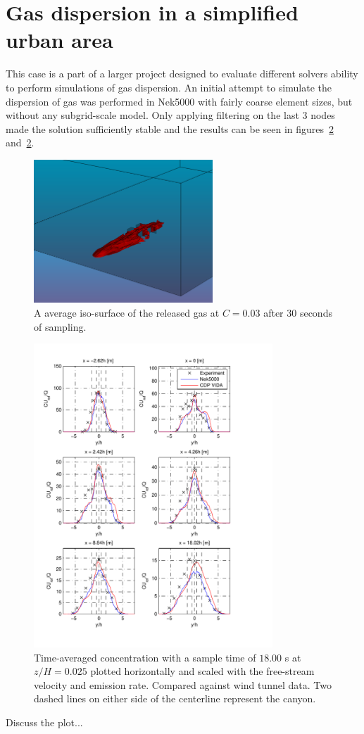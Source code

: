 \section{Gas dispersion in a simplified urban area} 
This case is a part of a larger project designed to evaluate different solvers 
ability to perform simulations of gas dispersion. An initial attempt to simulate the 
dispersion of gas was performed in Nek5000 with fairly coarse element sizes, but without
any subgrid-scale model. Only applying filtering on the last 3 nodes made the solution 
sufficiently stable and the results can be seen in figures~\ref{fig:cHfilter} and~\ref{fig:cHfilter}.
%
\begin{figure}[h]
	\centering
	\includegraphics[width=0.6\textwidth]{Figures/plume.png}
	\caption{A average iso-surface of the released gas at $C=0.03$ 
    after 30 seconds of sampling.}
	\label{fig:plume}
\end{figure}
%
%
\begin{figure}[h]
	\centering
	\includegraphics[width=0.8\textwidth]{Figures/NekcH.pdf}
	\caption{Time-averaged concentration with a sample time of $18.00$ s at $z/H = 0.025$ plotted horizontally and scaled 
	with the free-stream velocity and emission rate. Compared against wind tunnel data.
Two dashed lines on either side of the centerline represent the canyon.}
	\label{fig:cHfilter}
\end{figure}
%
Discuss the plot... 

